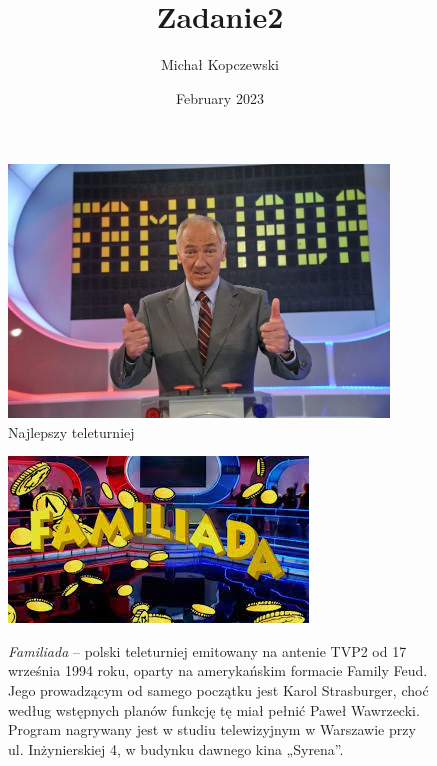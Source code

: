 \documentclass{beamer}
\title{Zadanie2}
\author{Michał Kopczewski}
\date{February 2023}
\begin{document}
\maketitle

\begin{frame}[label=Karol]
\begin{figure}[htbp]
\centering
\includegraphics[width=0.9\textwidth]{foto1.jpg}
\caption{Najlepszy teleturniej}
\end{figure}

\end{frame}
\begin{frame}[label=Logo]

\begin{figure}[htp]
\begin{minipage}{0.33\textwidth}
\centering
\includegraphics[width=\textwidth]{foto2.jpg}
\end{minipage}
\begin{minipage}{0.66\textwidth}
\centering
\textit{Familiada} – polski teleturniej emitowany na antenie TVP2 od 17 września 1994 roku, oparty na amerykańskim formacie Family Feud. 
Jego prowadzącym od samego początku jest Karol Strasburger, choć według wstępnych planów funkcję tę miał pełnić Paweł Wawrzecki. Program 
nagrywany jest w studiu telewizyjnym w Warszawie przy ul. Inżynierskiej 4, w budynku dawnego kina „Syrena”.
\end{minipage}
\end{figure}

\end{frame}
\end{document}
